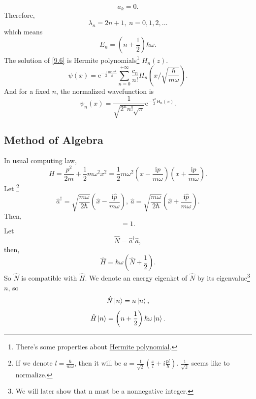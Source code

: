 \documentclass{article}
\theoremstyle{1}
\newcommand{\ii}{\mathrm{i}}
\newcommand{\ee}{\mathrm{e}}
\begin{document}
\begin{equation}
    a_{k}=0.
\end{equation}
Therefore, 
\begin{equation}
    \lambda_n=2n+1,\ n=0,1,2,\dots
\end{equation}
which means 
\begin{equation}
    E_n=\left(n+\frac{1}{2}\right)\hbar \omega.
\end{equation}
The solution of \eqref{9.6} is Hermite polynomials\footnote{There's some properties about \href{run:Hermite polynomial.pdf alias}{Hermite polynomial}.} $H_n(z)$.
\begin{equation}
    \psi(x)=\ee^{-\frac{1}{2}\frac{m\omega x^2}{\hbar}}\sum_{n=0}^{+\infty}\frac{c_n}{n!}H_n\left(x\slash\sqrt{\frac{\hbar}{m\omega}}\right).
\end{equation}
And for a fixed $n$, the normalized wavefunction is
\begin{equation}    
    \psi_n(x)=\frac{1}{\sqrt{2^nn!\sqrt{\pi}}}\ee^{-\frac{x^2}{2}H_n(x)}.
\end{equation}


\subsection{Method of Algebra}
In usual computing law, 
\begin{equation}
    H=\frac{p^2}{2m}+\frac{1}{2}m\omega^2x^2=\frac{1}{2}m\omega^2\left(x-\frac{\ii p}{m\omega}\right)\left(x+\frac{\ii p}{m\omega}\right).
\end{equation}
Let \footnote{If we denote $l=\frac{\hbar}{m\omega}$, then it will be $a=\frac{1}{\sqrt{2}}\left(\frac{x}{l}+i\frac{pl}{\hbar}\right)$. $\frac{1}{\sqrt{2}}$ seems like to normalize.}
\begin{equation}
    \hat{a}^\dagger=\sqrt{\frac{m\omega}{2\hbar}}\left(\hat{x}-\frac{\ii\hat{p}}{m\omega}\right),\ \hat{a}=\sqrt{\frac{m\omega}{2\hbar}}\left(\hat{x}+\frac{\ii\hat{p}}{m\omega}\right).
\end{equation}
Then, 
\begin{equation}
    [\hat{a},\hat{a}^\dagger]=1.
\end{equation}
Let 
\begin{equation}
    \hat{N}=\hat{a}^\dagger\hat{a},
\end{equation}
then,
\begin{equation}
    \hat{H}=\hbar\omega \left(\hat{N}+\frac{1}{2}\right).
\end{equation}
So $\hat{N}$ is compatible with $\hat{H}$. We denote an energy eigenket of $\hat{N}$ by its eigenvalue\footnote{We will later show that n must be a nonnegative integer.} $n$, so
\begin{equation}
    \hat{N}\ket{n}=n\ket{n},
\end{equation}
\begin{equation}
    \hat{H}\ket{n}=\left(n+\frac{1}{2}\right)\hbar\omega\ket{n}.
\end{equation}
\end{document}
